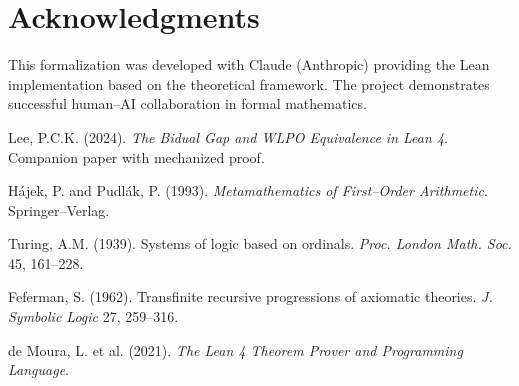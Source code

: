 \documentclass[11pt]{article}
\theoremstyle{definition}
\theoremstyle{remark}
\begin{document}
\section*{Acknowledgments}

This formalization was developed with Claude (Anthropic) providing the Lean implementation based on the theoretical framework. The project demonstrates successful human--AI collaboration in formal mathematics.

\begin{thebibliography}{10}

Lee, P.C.K. (2024). \emph{The Bidual Gap and WLPO Equivalence in Lean 4}. Companion paper with mechanized proof.

Hájek, P. and Pudlák, P. (1993). \emph{Metamathematics of First--Order Arithmetic}. Springer--Verlag.

Turing, A.M. (1939). Systems of logic based on ordinals. \emph{Proc. London Math. Soc.} 45, 161--228.

Feferman, S. (1962). Transfinite recursive progressions of axiomatic theories. \emph{J. Symbolic Logic} 27, 259--316.

de Moura, L. et al. (2021). \emph{The Lean 4 Theorem Prover and Programming Language}. 

\end{thebibliography}
\end{document}
